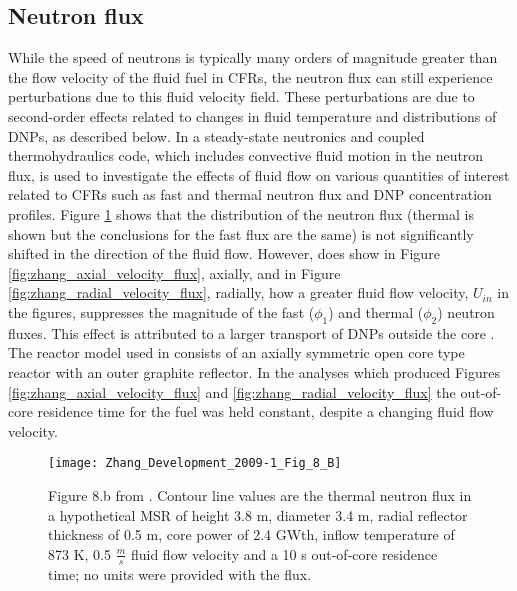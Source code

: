 \documentclass[review]{elsarticle}
\begin{document}
\subsection{Neutron flux} \label{ssec:flux}
While the speed of neutrons is typically many orders of magnitude greater than
the flow velocity of the fluid fuel in CFRs, the neutron flux can still experience
perturbations due to this fluid velocity field. These perturbations are due to
second-order effects related to changes in fluid temperature and distributions of
 DNPs, as described below. In \cite{zhang_development_2009-1}
 a steady-state  neutronics and coupled thermohydraulics code, which includes convective
fluid motion in the neutron flux, is used to investigate the effects of fluid
flow on various quantities of interest related to CFRs such as fast and thermal
neutron flux and DNP concentration profiles. 
Figure \ref{fig:zhang_2d_flux} \cite{zhang_development_2009-1} shows that the
distribution of the neutron flux (thermal is shown but the conclusions for 
the fast flux are the same) is not significantly shifted in the direction
of the fluid flow. However, \cite{zhang_development_2009-1} does show in 
Figure \ref{fig:zhang_axial_velocity_flux}, axially, and in 
Figure \ref{fig:zhang_radial_velocity_flux}, radially, how a greater fluid flow
 velocity, $U_{in}$ in the figures, suppresses the magnitude of the fast
 ($\phi_{1}$) and thermal ($\phi_{2}$) neutron fluxes. This effect is
 attributed to a larger transport of DNPs outside
 the core \cite{zhang_development_2009-1}. The reactor model
 used in \cite{zhang_development_2009-1} consists of an axially symmetric
 open core type reactor with an outer graphite reflector. In the analyses which
 produced Figures \ref{fig:zhang_axial_velocity_flux} and \ref{fig:zhang_radial_velocity_flux} the
 out-of-core residence time for the fuel was held constant, despite a changing
 fluid flow velocity.

\begin{figure}[H]
   \centering
   \texttt{[image: Zhang\_Development\_2009-1\_Fig\_8\_B]}
   \caption{Figure 8.b from \cite{zhang_development_2009-1}. Contour line
    values are the thermal neutron flux in a hypothetical MSR of height 3.8 m, diameter 3.4 m,
    radial reflector thickness of 0.5 m, core power of 2.4 GWth, inflow temperature of 873 K,
    0.5 $\frac{m}{s}$ fluid flow
    velocity and a 10 s out-of-core residence time; no units were provided with the flux.} 
   \label{fig:zhang_2d_flux}
\end{figure}
\end{document}
